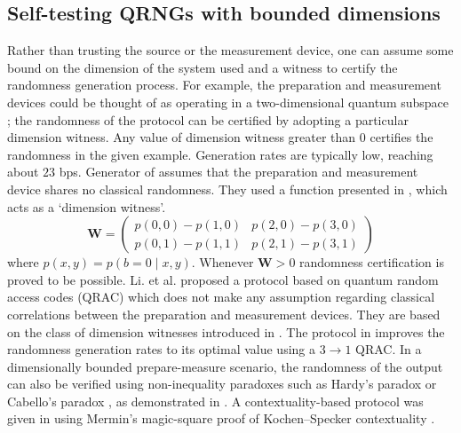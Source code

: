 \documentclass[]{interact}
\theoremstyle{plain}%
\theoremstyle{definition}
\theoremstyle{remark}
\begin{document}
\subsection{Self-testing QRNGs with bounded dimensions} Rather than trusting the source or the measurement device, one can assume some bound on the dimension of the system used and a witness to certify the randomness generation process. For example, the preparation and measurement devices could be thought of as operating in a two-dimensional quantum subspace \cite{Lunghi_2015}; the randomness of the protocol can be certified by adopting a particular dimension
witness. Any value of dimension witness greater than $0$ certifies the
randomness in the given example. Generation rates are typically low, reaching about $23$ bps. Generator of \cite{Lunghi_2015} assumes that the preparation and measurement device shares no classical randomness. They used a function presented in \cite{PhysRevLett.112.140407}, which acts as a `dimension witness'.
$$
\mathbf{W}=\left(\begin{array}{ll}
p(0,0)-p(1,0) & p(2,0)-p(3,0) \\
p(0,1)-p(1,1) & p(2,1)-p(3,1)
\end{array}\right)
$$
where $p(x, y)=p(b=0 \mid x, y)$. Whenever $\mathbf{W}>0$ randomness certification is proved to be possible.
Li. et al. \cite{li2011semi} proposed a protocol based on quantum random access codes (QRAC)\cite{ambainis2008quantum, PhysRevA.104.012420} which does not make any assumption regarding classical correlations between the preparation and measurement devices. They are based on the class of dimension witnesses introduced in \cite{PhysRevLett.105.230501}. The protocol in \cite{li2012semi} improves the randomness generation rates to its optimal value \cite{mannalath2021bounds} using a $3\rightarrow1$ QRAC. In a dimensionally bounded prepare-measure scenario, the randomness of the output can also be verified using non-inequality paradoxes such as Hardy’s paradox \cite{Hardy1992May} or Cabello’s paradox \cite{Cabello2002Feb}, as demonstrated in \cite{Li2015Aug}. A contextuality-based protocol was given in \cite{Pan2021Mar} using Mermin’s magic-square proof of Kochen–Specker contextuality \cite{Mermin1990Dec}. \\
\end{document}
